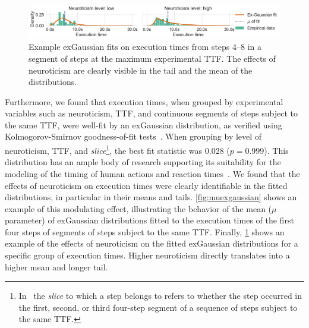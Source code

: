 \begin{figure}
    \centering
    \includegraphics[width=\textwidth]{figs/new_model/dist_fits_neuro}
    \caption{%
        Example \gls{exGaussian} fits on execution times from steps \numrange{4}{8} in a segment of steps at the maximum experimental \gls{TTF}.
        The effects of neuroticism are clearly visible in the tail and the mean of the distributions.
    }\label{fig:fitsneuro}
\end{figure}

Furthermore, we found that execution times, when grouped by experimental variables such as neuroticism, \gls{TTF}, and continuous segments of steps subject to the same \gls{TTF}, were well-fit by an \gls{exGaussian} distribution, as verified using Kolmogorov-Smirnov goodness-of-fit tests~\cite{massey_jr1951kolmogorov}.
When grouping by level of neuroticism, \gls{TTF}, and \emph{slice}\footnote{%
In~\cite{olguinmunoz2021impact} the \emph{slice} to which a step belongs to refers to whether the step occurred in the first, second, or third four-step segment of a sequence of steps subject to the same \gls{TTF}.
}, the best fit statistic was \ensuremath{0.028} (\ensuremath{p = 0.999}).
This distribution has an ample body of research supporting its suitability for the modeling of the timing of human actions and reaction times~\cite{rohrer1994analysis,palmer2011what,marmolejo_ramos2022generalised}.
We found that the effects of neuroticism on execution times were clearly identifiable in the fitted distributions, in particular in their means and tails.
\cref{fig:muexgaussian} shows an example of this modulating effect, illustrating the behavior of the mean (\( \mu \) parameter) of \gls{exGaussian} distributions fitted to the execution times of the first four steps of segments of steps subject to the same \gls{TTF}.
Finally, \cref{fig:fitsneuro} shows an example of the effects of neuroticism on the fitted \gls{exGaussian} distributions for a specific group of execution times.
Higher neuroticism directly translates into a higher mean and longer tail.
